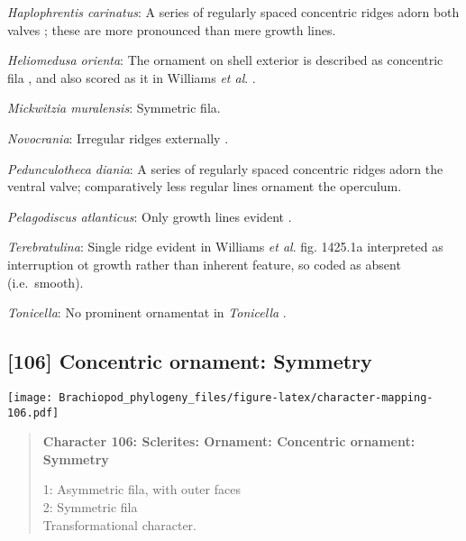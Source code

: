 \documentclass[openany]{book}
\theoremstyle{definition}
\theoremstyle{definition}
\theoremstyle{definition}
\theoremstyle{remark}
\begin{document}
\hypertarget{Haplophrentis_carinatus-coding-105}{}
\emph{Haplophrentis carinatus}: A series of regularly spaced concentric
ridges adorn both valves \citep{Moysiuk2017Hyolithsare}; these are more
pronounced than mere growth lines.

\hypertarget{Heliomedusa_orienta-coding-105}{}
\emph{Heliomedusa orienta}: The ornament on shell exterior is described
as concentric fila \citep[P.43]{Chen2007Reinterpretationof}, and also
scored as it in Williams \emph{et al}.
\citeyearpar[pp.160--163]{Williams2000LinguliformeaCraniiformea}.

\hypertarget{Mickwitzia_muralensis-coding-105}{}
\emph{Mickwitzia muralensis}: Symmetric fila.

\hypertarget{Novocrania-coding-105}{}
\emph{Novocrania}: Irregular ridges externally
\citep{Williams2000LinguliformeaCraniiformea}.

\hypertarget{Pedunculotheca_diania-coding-105}{}
\emph{Pedunculotheca diania}: A series of regularly spaced concentric
ridges adorn the ventral valve; comparatively less regular lines
ornament the operculum.

\hypertarget{Pelagodiscus_atlanticus-coding-105}{}
\emph{Pelagodiscus atlanticus}: Only growth lines evident
\citep{Williams2000LinguliformeaCraniiformea}.

\hypertarget{Terebratulina-coding-105}{}
\emph{Terebratulina}: Single ridge evident in Williams \emph{et al}.
\citeyearpar{Williams2006Rhynchonelliformeapart} fig. 1425.1a
interpreted as interruption ot growth rather than inherent feature, so
coded as absent (i.e.~smooth).

\hypertarget{Tonicella-coding-105}{}
\emph{Tonicella}: No prominent ornamentat in \emph{Tonicella}
\citep{Connors2012}.

\subsection*{{[}106{]} Concentric ornament:
Symmetry}\label{concentric-ornament-symmetry}

\texttt{[image: Brachiopod\_phylogeny\_files/figure-latex/character-mapping-106.pdf]}

\begin{quote}
\textbf{Character 106: Sclerites: Ornament: Concentric ornament:
Symmetry}

1: Asymmetric fila, with outer faces\\
2: Symmetric fila\\
Transformational character.
\end{quote}
\end{document}
